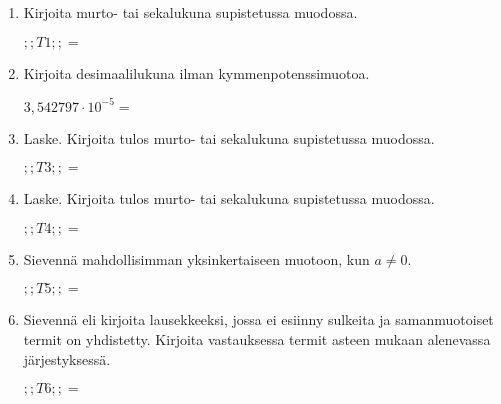 \documentclass[finnish, a4paper, 12pt]{article}
\begin{document}
	\begin{enumerate}[leftmargin=*]
		\setlength\itemsep{1em}
		
		\item %
		Kirjoita murto- tai sekalukuna supistetussa muodossa. 
		
		\(
		;;T1;; = 
		\) %
		
		\vspace{8pt}
		
		\item %
		Kirjoita desimaalilukuna ilman kymmenpotenssimuotoa. 
		
		\(
		3{,}542797\cdot 10^{-5} = 
		\) %
		
		\vspace{8pt}
		
		\item %
		Laske. Kirjoita tulos murto- tai sekalukuna supistetussa muodossa.
		
		\(
		\displaystyle
		;;T3;; = 
		\) %
		
		\vspace{8pt}
		
		\item %
		Laske. Kirjoita tulos murto- tai sekalukuna supistetussa muodossa.
		
		\(
		\displaystyle
		;;T4;; = 
		\) %
		
		\vspace{8pt}
		
		\item %
		Sievennä mahdollisimman yksinkertaiseen muotoon, kun \(a \not = 0\). 
		
		\(
		\displaystyle
		;;T5;; =
		\phantom{mmmmmmmmmmmmmmm}
		\) %
		
		\vspace{8pt}
		
		\item %
		Sievennä eli kirjoita lausekkeeksi, jossa ei esiinny sulkeita ja 
		samanmuotoiset termit on yhdistetty. 
		Kirjoita vastauksessa termit asteen mukaan alenevassa järjestyksessä. 
		
		\(
		\displaystyle
		;;T6;; = 
		\) %
		
		\vspace{8pt}
		

\end{enumerate}
\end{document}
